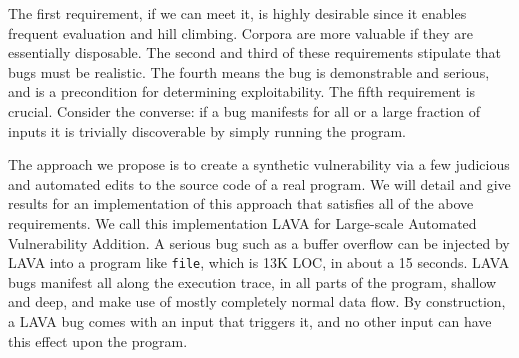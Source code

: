 \noindent
The first requirement, if we can meet it, is highly desirable since it enables frequent evaluation and hill climbing. 
Corpora are more valuable if they are essentially disposable. 
The second and third of these requirements stipulate that bugs must be realistic.
The fourth means the bug is demonstrable and serious, and is a precondition for determining exploitability. 
The fifth requirement is crucial.
Consider the converse: if a bug manifests for all or a large fraction of inputs it is trivially discoverable by simply running the program.

The approach we propose is to create a synthetic vulnerability via a few judicious and automated edits to the source code of a real program.
We will detail and give results for an implementation of this approach that satisfies all of the above requirements.
We call this implementation LAVA for Large-scale Automated Vulnerability Addition.    
A serious bug such as a buffer overflow can be injected by LAVA into a program like \verb+file+, which is 13K LOC, in about a 15 seconds.
LAVA bugs manifest all along the execution trace, in all parts of the program, shallow and deep, and make use of mostly completely normal data flow.
By construction, a LAVA bug comes with an input that triggers it, and no other input can have this effect upon the program.
